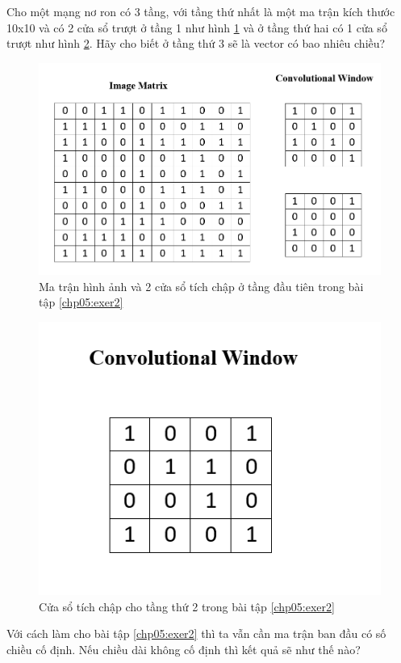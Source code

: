 \begin{exer}
\label{chp05:exer2}
Cho một mạng nơ ron có 3 tầng, với tầng thứ nhất là một ma trận kích thước 10x10 và có 2 cửa sổ trượt ở tầng 1 như hình \ref{fig:CNNExercise2a} và ở tầng thứ hai có 1 cửa sổ trượt như hình \ref{fig:CNNExercise2b}. Hãy cho biết ở tầng thứ 3 sẽ là vector có bao nhiêu chiều?
\begin{figure}[!h]
	\centering
		\includegraphics[width=1.0\columnwidth]{chapter05/figure/exercise2a.png}
		\centering
	\caption{Ma trận hình ảnh và 2 cửa sổ tích chập ở tầng đầu tiên trong bài tập \ref{chp05:exer2}}
	\label{fig:CNNExercise2a}
\end{figure}
\begin{figure}[!h]
	\centering
		\includegraphics[width=0.6\columnwidth]{chapter05/figure/exercise2b.png}
		\centering
	\caption{Cửa sổ tích chập cho tầng thứ 2 trong bài tập \ref{chp05:exer2}}
	\label{fig:CNNExercise2b}
\end{figure}
\end{exer}

\begin{exer}
Với cách làm cho bài tập \ref{chp05:exer2} thì ta vẫn cần ma trận ban đầu có số chiều cố định. Nếu chiều dài không cố định thì kết quả sẽ như thế nào?
\end{exer}

